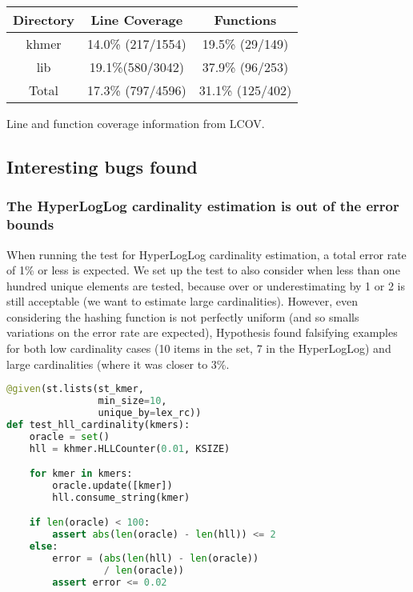 \documentclass[preprint,nocopyrightspace]{sig-alternate}
\begin{document}
\noindent
\begin{minipage}{\columnwidth}
  \captionsetup{type=table}
  \centering
  \begin{tabular}{|c|c|c|}
  \toprule
  Directory & Line Coverage & Functions \\
  \midrule
  khmer		& 14.0\% (217/1554)	& 19.5\% (29/149) \\
  lib		& 19.1\%(580/3042)	& 37.9\% (96/253) \\
  Total		& 17.3\% (797/4596)	& 31.1\% (125/402) \\
  \bottomrule
  \end{tabular}
  \medskip

  \caption{Line and function coverage information from LCOV.}\label{table:lcov}
\end{minipage}

\subsection{Interesting bugs found}

\subsubsection{The HyperLogLog cardinality estimation is out of the error bounds}

When running the test for HyperLogLog cardinality estimation,
a total error rate of 1\% or less is expected.
We set up the test to also consider when less than one hundred unique elements are tested,
because over or underestimating by 1 or 2 is still acceptable (we want to estimate large cardinalities).
However,
even considering the hashing function is not perfectly uniform (and so smalls variations on the error rate are expected),
Hypothesis found falsifying examples for both low cardinality cases (10 items in the set, 7 in the HyperLogLog) and large cardinalities (where it was closer to 3\%.

\begin{lstlisting}[language=Python,basicstyle=\small\tt,caption={HyperLogLog cardinality estimation test},label=hlltest]
@given(st.lists(st_kmer,
                min_size=10,
                unique_by=lex_rc))
def test_hll_cardinality(kmers):
    oracle = set()
    hll = khmer.HLLCounter(0.01, KSIZE)

    for kmer in kmers:
        oracle.update([kmer])
        hll.consume_string(kmer)

    if len(oracle) < 100:
        assert abs(len(oracle) - len(hll)) <= 2
    else:
        error = (abs(len(hll) - len(oracle))
                 / len(oracle))
        assert error <= 0.02
\end{lstlisting}
\end{document}

